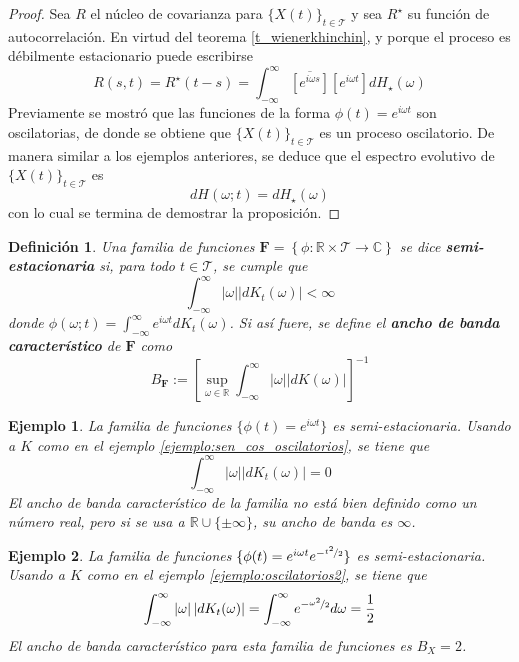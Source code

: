 \documentclass[12pt,letterpaper]{book}
\newtheorem{definicion}{Definición}[chapter]
\newtheorem{ejemplo}{Ejemplo}[chapter]
\newcommand{\R}{\mathbb{R}}
\newcommand{\C}{\mathbb{C}}
\newcommand{\intR}{\int_{-\infty}^{\infty}}
\newcommand{\ef}{\mathbf{F}}
\newcommand{\abso}[1]{\left| #1 \right|}
\newcommand{\xt}{$\{X(t)\}_{t\in \mathcal{T}}$ }
\begin{document}
\begin{proof}
Sea $R$ el núcleo de covarianza para \xt y sea $R^\star$ su función de autocorrelación. 
%
En virtud del teorema \ref{t_wienerkhinchin}, y porque el proceso es débilmente estacionario puede escribirse
\begin{equation}
R(s,t) = R^\star({t-s}) 
= \intR  \overline{\left[e^{i \omega {s}}\right]} \left[e^{i \omega {t}}\right]  dH_\star(\omega)
\end{equation}
%
Previamente se mostró que las funciones de la forma $\phi(t) = e^{i \omega t}$ son oscilatorias, de donde se obtiene que \xt es un proceso oscilatorio.
%
De manera similar a los ejemplos anteriores, se deduce que el espectro evolutivo de \xt es
\begin{equation}
dH(\omega; t) = dH_\star(\omega)
\end{equation}
con lo cual se termina de demostrar la proposición.
\end{proof}

\begin{definicion}
Una familia de funciones $\ef = \left\{ \phi: \R \times \mathcal{T} \rightarrow \C \right\}$ se dice \textbf{semi-estacionaria} si, para todo $t \in \mathcal{T}$, se cumple que
\begin{equation}
\intR \abso{\omega} \abso{dK_t(\omega)} < \infty
\end{equation}
donde $\phi(\omega; t) = \intR e^{i \omega t} dK_t(\omega)$. Si así fuere, se define el \textbf{ancho de banda característico} de $\ef$ como
\begin{equation}
B_\ef := \left[ \sup_{\omega\in\R} \intR \abso{\omega} \abso{dK(\omega)} \right]^{-1}
\end{equation}
\end{definicion}

\begin{ejemplo}
\label{lazy12}
La familia de funciones $\{ \phi(t) = e^{i \omega t} \}$ es semi-estacionaria. Usando a $K$ como en el ejemplo \ref{ejemplo:sen_cos_oscilatorios}, se tiene que
\begin{equation}
\intR \abso{\omega} \abso{dK_t(\omega)} = 0
\end{equation}
El ancho de banda característico de la familia no está bien definido como un número real, pero si se usa a $\R\cup \{ \pm \infty \}$, su ancho de banda es $\infty$.
\end{ejemplo}

\begin{ejemplo}
La familia de funciones $\{ \phi(t) = e^{i \omega t} e^{-\nicefrac{t^2}{2}} \}$ es semi-estacionaria. Usando a $K$ como en el ejemplo \ref{ejemplo:oscilatorios2}, se tiene que
\begin{equation}
\intR \abso{\omega} \abso{dK_t(\omega)} = \intR e^{-\nicefrac{\omega^2}{2}} d\omega = \frac{1}{2}
\end{equation}
El ancho de banda característico para esta familia de funciones es $B_X=2$.
\end{ejemplo}
\end{document}
